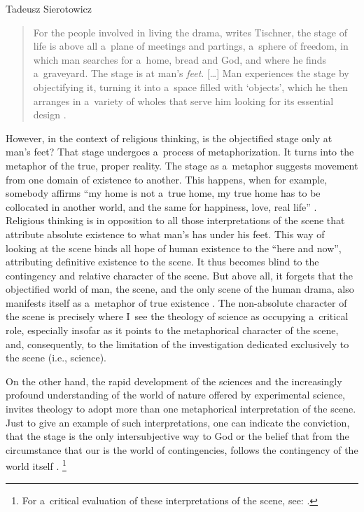 \begin{artengenv}{Tadeusz Sierotowicz}
\begin{quote}
For the people involved in living the drama, writes Tischner, the stage of life is above all a~plane of meetings and partings, a~sphere of freedom, in which man searches for a~home, bread and God, and where he finds a~graveyard. The stage is at man's \textit{feet}. […] Man experiences the stage by objectifying it, turning it into a~space filled with ‘objects', which he then arranges in a~variety of wholes that serve him looking for its essential design 
\parencite[][p.166]{jagiello_jozef_2020}.%
\end{quote}




However, in the context of religious thinking, is the objectified stage only at man's feet? That stage undergoes a~process of metaphorization. It turns into the metaphor of the true, proper reality. The stage as a~metaphor suggests movement from one domain of existence to another. This happens, when for example, somebody affirms ``my home is not a~true home, my true home has to be collocated in another world, and the same for happiness, love, real life'' 
\parencite[][p.388]{tischner_myslenie_2011-1}. %
 Religious thinking is in opposition to all those interpretations of the scene that attribute absolute existence to what man's has under his feet. This way of looking at the scene binds all hope of human existence to the ``here and now'', attributing definitive existence to the scene. It thus becomes blind to the contingency and relative character of the scene. But above all, it forgets that the objectified world of man, the scene, and the only scene of the human drama, also manifests itself as a~metaphor of true existence 
\parencite[][p.391]{tischner_myslenie_2011-1}. %
 The non-absolute character of the scene is precisely where I~see the theology of science as occupying a~critical role, especially insofar as it points to the metaphorical character of the scene, and, consequently, to the limitation of the investigation dedicated exclusively to the scene (i.e., science).



On the other hand, the rapid development of the sciences and the increasingly profound understanding of the world of nature offered by experimental science, invites theology to adopt more than one metaphorical interpretation of the scene. Just to give an example of such interpretations, one can indicate the conviction, that the stage is the only intersubjective way to God or the belief that from the circumstance that our is the world of contingencies, follows the contingency of the world itself 
\parencite[][pp.386–387]{tischner_myslenie_2011-1}.%
\footnote{For a~critical evaluation of these interpretations of the scene, see: 
\parencite[][]{hunsinger_barth_2019}.%
}




\end{artengenv}
